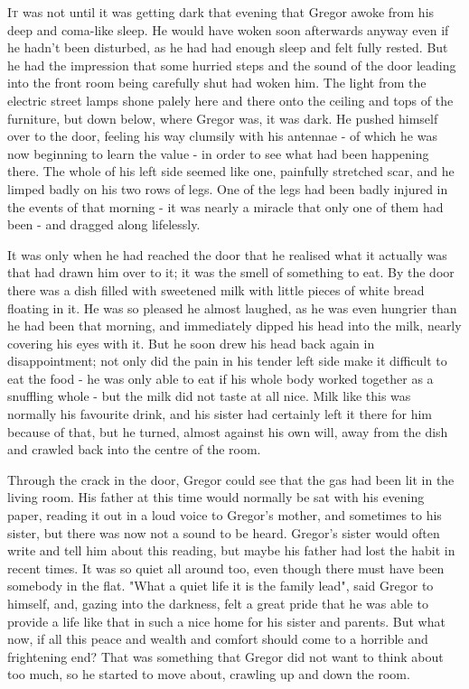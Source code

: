 \documentclass[11pt,openany]{memoir}
\begin{document}
\lettrine[lines=3]{I}{t} was not until it was getting dark that evening that Gregor awoke
from his deep and coma-like sleep.  He would have woken soon
afterwards anyway even if he hadn't been disturbed, as he had had
enough sleep and felt fully rested.  But he had the impression that
some hurried steps and the sound of the door leading into the front
room being carefully shut had woken him.  The light from the
electric street lamps shone palely here and there onto the ceiling
and tops of the furniture, but down below, where Gregor was, it was
dark.  He pushed himself over to the door, feeling his way clumsily
with his antennae - of which he was now beginning to learn the value
- in order to see what had been happening there.  The whole of his
left side seemed like one, painfully stretched scar,  and he limped
badly on his two rows of legs.  One of the legs had been badly
injured in the events of that morning - it was nearly a miracle that
only one of them had been - and dragged along lifelessly.

It was only when he had reached the door that he realised what it
actually was that had drawn him over to it; it was the smell of
something to eat.  By the door there was a dish filled with
sweetened milk with little pieces of white bread floating in it.  He
was so pleased he almost laughed, as he was even hungrier than he
had been that morning, and immediately dipped his head into the
milk, nearly covering his eyes with it.  But he soon drew his head
back again in disappointment; not only did the pain in his tender
left side make it difficult to eat the food - he was only able to
eat if his whole body worked together as a snuffling whole - but the
milk did not taste at all nice.  Milk like this was normally his
favourite drink, and his sister had certainly left it there for him
because of that, but he turned, almost against his own will, away
from the dish and crawled back into the centre of the room.

Through the crack in the door, Gregor could see that the gas had
been lit in the living room.  His father at this time would normally
be sat with his evening paper, reading it out in a loud voice to
Gregor's mother, and sometimes to his sister, but there was now not
a sound to be heard.  Gregor's sister would often write and tell him
about this reading, but maybe his father had lost the habit in
recent times.  It was so quiet all around too, even though there
must have been somebody in the flat.  "What a quiet life it is the
family lead", said Gregor to himself, and, gazing into the darkness,
felt a great pride that he was able to provide a life like that in
such a nice home for his sister and parents.  But what now, if all
this peace and wealth and comfort should come to a horrible and
frightening end? That was something that Gregor did not want to
think about too much, so he started to move about, crawling up and
down the room.
\end{document}
